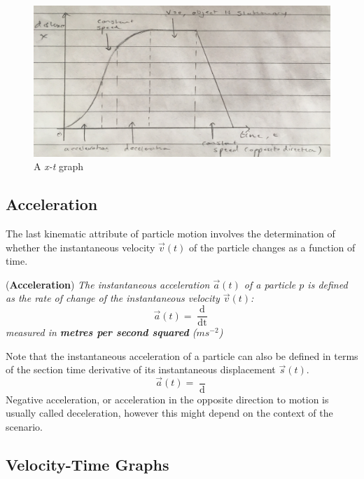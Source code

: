 \begin{figure}[h!]
    \centering
    \includegraphics[scale=0.1]{notes/images/Distance-Time-Graph.jpg}
    \caption{A \textit{x-t} graph}
\end{figure}
\FloatBarrier

\subsection{Acceleration}

The last kinematic attribute of particle motion involves the determination of whether the instantaneous velocity $\vec{v}(t)$ of the particle changes as a function of time.

\begin{definition}{(\textbf{Acceleration})}
\label{def:acceleration}
\textit{The instantaneous acceleration $\vec{a}(t)$ of a particle $p$ is defined as the rate of change of the instantaneous velocity $\vec{v}(t)$: }
\begin{equation}
 \vec{a}(t) = \frac{\mathop{\mathrm{d}\vec{v}(t)}}{\mathop{\mathrm{d}t}}  
\end{equation}
\textit{measured in \textbf{metres per second squared} ($ms^{-2}$)}
\end{definition}
Note that the instantaneous acceleration of a particle can also be defined in terms of the section time derivative of its instantaneous displacement $\vec{s}(t)$.
\begin{equation*}
    \vec{a}(t) = \frac{\mathop{\mathrm{d}^2\vec{s}(t)}}{\mathop{\mathrm{d}t^2}}
\end{equation*}
Negative acceleration, or acceleration in the opposite direction to motion is usually called deceleration, however this might depend on the context of the scenario. 

\subsection{Velocity-Time Graphs}

